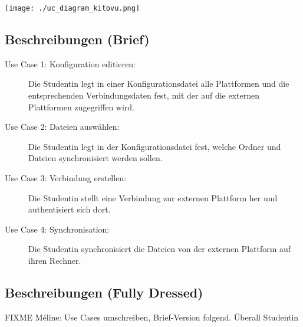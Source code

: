 \documentclass[a4paper]{article}
\begin{document}
\texttt{[image: ./uc\_diagram\_kitovu.png]}

\subsection{Beschreibungen (Brief)}
\begin{description}
	
\item[Use Case 1: Konfiguration editieren:] Die Studentin legt in einer Konfigurationsdatei alle Plattformen und die entsprechenden Verbindungsdaten fest, mit der auf die externen Plattformen zugegriffen wird.

\item[Use Case 2: Dateien auswählen:] Die Studentin legt in der Konfigurationsdatei fest, welche Ordner und Dateien synchronisiert werden sollen.

\item[Use Case 3: Verbindung erstellen:] Die Studentin stellt eine Verbindung zur externen Plattform her und authentisiert sich dort.

\item[Use Case 4: Synchronisation:] Die Studentin synchronisiert die Dateien von der externen Plattform auf ihren Rechner.
\end{description}

\pagebreak
\subsection{Beschreibungen (Fully Dressed)}

FIXME Méline: Use Cases umschreiben, Brief-Version folgend. Überall Studentin

\end{document}
